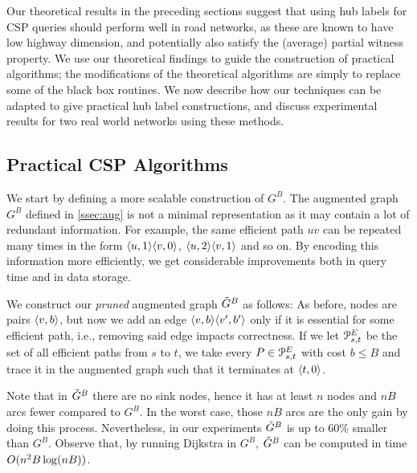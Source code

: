 Our theoretical results in the preceding sections suggest that using hub labels for CSP queries should perform well in road networks, as these are known to have low highway dimension, and potentially also satisfy the (average) partial witness property. 
We use our theoretical findings to guide the construction of practical algorithms; the modifications of the theoretical algorithms are simply to replace some of the black box routines.
We now describe how our techniques can be adapted to give practical hub label constructions, and discuss experimental results for two real world networks using these methods. 
\subsection{Practical CSP Algorithms} 
\label{ssec:practical}

We start by defining a more scalable construction of $G^B$.
The augmented graph $G^B$ defined in \cref{ssec:aug} is not a minimal representation as it may contain a lot of redundant information.
For example, the same efficient path $uv$ can be repeated many times in the form $\langle u,1\rangle\langle v,0\rangle$, $\langle u,2\rangle\langle v,1\rangle$ and so on.
By encoding this information more efficiently, we get considerable improvements both in query time and in data storage.

We construct our \emph{pruned} augmented graph $\tilde G^B$ as follows:
As before, nodes are pairs $\langle v,b\rangle$, but now we add an edge $\langle v,b\rangle\langle v',b'\rangle$ only if it is essential for some efficient path, i.e., removing said edge impacts correctness.
If we let $\mathcal{P}_{s,t}^E$ be the set of all efficient paths from $s$ to $t$, we take every $P\in \mathcal{P}_{s,t}^E$ with cost $b\leq B$ and trace it in the augmented graph such that it terminates at $\langle t,0\rangle$.

Note that in $\tilde G^B$ there are no sink nodes, hence it has at least $n$ nodes and $nB$ arcs fewer compared to $G^B$.
In the worst case, those $nB$ arcs are the only gain by doing this process.
Nevertheless, in our experiments $\tilde G^B$ is up to 60\% smaller than $G^B$.
Observe that, by running Dijkstra in $G^B$, $\tilde G^B$ can be computed in time $O(n^2B\log(nB))$.

